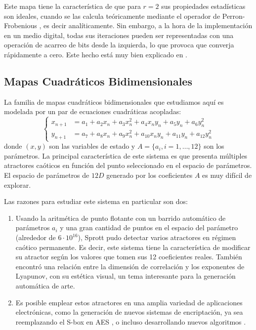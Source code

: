 Este mapa tiene la característica de que para $r = 2$ sus propiedades estadísticas son ideales, cuando se las calcula teóricamente mediante el operador de Perron-Frobenious \cite{Lasota1994, Lasota1973}, es decir analíticamente.
Sin embargo, a la hora de la implementación en un medio digital, todas sus iteraciones pueden ser representadas con una operación de acarreo de bits desde la izquierda, lo que provoca que converja rápidamente a cero.
Este hecho está muy bien explicado en \cite{Li2004}.

\subsection{Mapas Cuadráticos Bidimensionales}
\label{ssecQMaps}

La familia de mapas cuadráticos bidimensionales que estudiamos aquí es modelada por un par de ecuaciones cuadráticas acopladas:
%
\begin{equation}\label{eq:mapaSprott}
\left\{\begin{aligned}
x_{n+1}&=a_1+a_2 x_n+a_3 x_n^2+a_4 x_n y_n+a_5 y_n+a_6 y_n^2\\
y_{n+1}&=a_7+a_8 x_n+a_9 x_n^2+a_{10} x_n y_n+a_{11} y_n+a_{12} y_n^2
\end{aligned}
\right.
\end{equation}
%
donde $(x, y)$ son las variables de estado y $A = \{a_i, i = 1, \dots, 12 \}$ son los parámetros.
La principal característica de este sistema es que presenta múltiples atractores caóticos en función del punto seleccionado en el espacio de parámetros.
El espacio de parámetros de $12D$ generado por los coeficientes $A$ es muy difícil de explorar.

Las razones para estudiar este sistema en particular son dos:
%
\begin{enumerate}
	\item Usando la aritmética de punto flotante con un barrido automático de parámetros $a_i$ y una gran cantidad de puntos en el espacio del parámetro (alrededor de $6\cdot10 ^ {16}$), Sprott pudo detectar varios atractores en régimen caótico permanente.
	Es decir, este sistema tiene la característica de modificar su atractor según los valores que tomen sus 12 coeficientes reales.
	También encontró una relación entre la dimensión de correlación y los exponentes de Lyapunov, con su estética visual, un tema interesante para la generación automática de arte.
	\item Es posible emplear estos atractores en una amplia variedad de aplicaciones electrónicas, como la generación de nuevos sistemas de encriptación, ya sea reemplazando el S-box en AES \cite{Ahmad2013, Hussain2013}, o incluso desarrollando nuevos algoritmos \cite{Machado2004, Smaoui2009}.
\end{enumerate}

